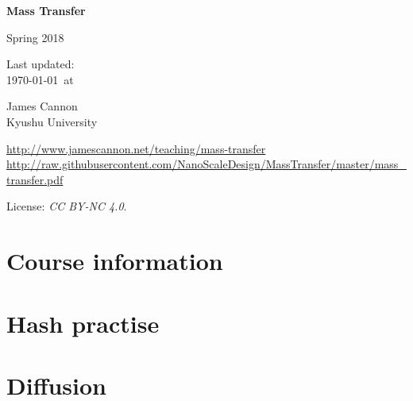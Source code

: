 \documentclass[a4paper]{book} %
\newcommand{\courseurl}{mass-transfer}
\begin{document}
\begin{titlepage}
    \begin{center}
        \vspace*{1cm}

        \Huge
        \textbf{Mass Transfer}

        Spring 2018

        \vspace{1.5cm}
        \Large
        Last updated:\\\today \ at \currenttime

        \vspace{4.0cm}
        \LARGE
        James Cannon\\Kyushu University
        \vfill

        \normalsize
        \url{http://www.jamescannon.net/teaching/\courseurl}\\
        \vspace{0.3cm}
        \small
        \url{http://raw.githubusercontent.com/NanoScaleDesign/MassTransfer/master/mass_transfer.pdf}
        \vspace{0.5cm}

        License: \emph{CC BY-NC 4.0}.

    \end{center}
\end{titlepage}

\setcounter{chapter}{-1}

\tableofcontents

\chapter{Course information}
\newpage


%



\chapter{Hash practise}


\chapter{Diffusion}


%
\end{document}
